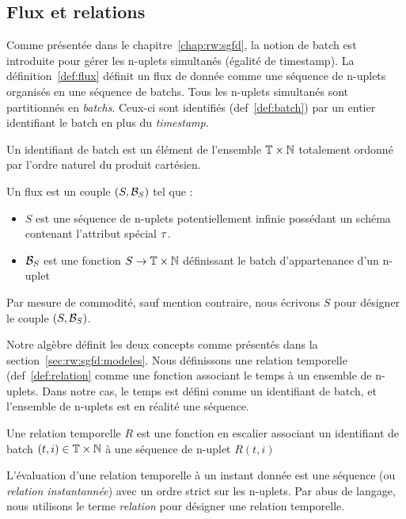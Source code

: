 \subsection{Flux et relations}
Comme présentée dans le chapitre~\ref{chap:rw:sgfd}, la notion de batch est introduite pour gérer les n-uplets simultanés (égalité de timestamp). La définition~\ref{def:flux}  définit un flux de donnée comme une séquence de n-uplets organisés en une séquence de batchs. Tous les n-uplets simultanés sont partitionnés en \textit{batchs}. Ceux-ci sont identifiés (def~\ref{def:batch}) par un entier identifiant le batch en plus du \textit{timestamp}.
\begin{defi}\label{def:batch}
    Un identifiant de batch est un élément de l'ensemble $\mathbb{T}\times\mathbb{N}$ totalement ordonné par l'ordre naturel du produit cartésien.
\end{defi}
\begin{defi}[Flux]\label{def:flux}
    Un flux est un couple $(S,\mathcal{B}_S)$ tel que :
    \begin{itemize}
        \item $S$ est une séquence de n-uplets potentiellement infinie possédant un schéma contenant l'attribut spécial $\tau$.
        \item $\mathcal{B}_S$ est une fonction $S\to \mathbb{T}\times\mathbb{N}$ définissant le batch d'appartenance d'un n-uplet
    \end{itemize}
    
    Par mesure de commodité, sauf mention contraire, nous écrivons $S$ pour désigner le couple $(S,\mathcal{B}_S)$.
\end{defi}

Notre algèbre définit les deux concepts comme présentés dans la section~\ref{sec:rw:sgfd:modeles}. Nous définissons une relation temporelle (def~\ref{def:relation} comme une fonction associant le temps à un ensemble de n-uplets. Dans notre cas, le temps est défini comme un identifiant de batch, et l'ensemble de n-uplets est en réalité une séquence.
\begin{defi}\label{def:relation}
	Une relation temporelle $R$ est une fonction en escalier associant un identifiant de batch $(t,i)\in\mathbb{T}\times\mathbb{N}$ à une séquence de n-uplet $R(t,i)$
\end{defi}
L'évaluation d'une relation temporelle à un instant donnée est une séquence (ou \textit{relation instantannée}) avec un ordre strict sur les n-uplets. Par abus de langage, nous utilisons le terme \textit{relation} pour désigner une relation temporelle.

